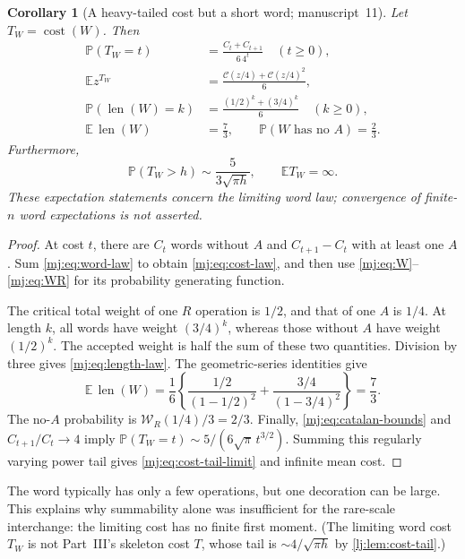 \documentclass[11pt,a4paper]{article}
\newtheorem{corollary}[corollary]{Corollary}
\theoremstyle{definition}\newaliascnt{definition}{theorem}
\theoremstyle{remark}\newaliascnt{remark}{theorem}
\newcommand{\Cat}{\mathcal C}
\newcommand{\ljP}{\mathbb P}
\newcommand{\ljE}{\mathbb E}
\newcommand{\ljcost}{\operatorname{cost}}
\newcommand{\mjlen}{\operatorname{len}}
\begin{document}
\begin{corollary}[A heavy-tailed cost but a short word; manuscript~11]
\label{mj:cor:wordstats}
Let $T_W=\ljcost(W)$. Then
\begin{align}
 \ljP(T_W=t)&=\frac{C_t+C_{t+1}}{6\,4^t}\quad(t\ge0),
 \label{mj:eq:cost-law}\\
 \ljE z^{T_W}&=\frac{\Cat(z/4)+\Cat(z/4)^2}{6},
 \label{mj:eq:cost-pgf}\\
 \ljP(\mjlen(W)=k)&=\frac{(1/2)^k+(3/4)^k}{6}\quad(k\ge0),
 \label{mj:eq:length-law}\\
 \ljE\,\mjlen(W)&=\frac73,
 \qquad
 \ljP(W\text{ has no }A)=\frac23.
 \label{mj:eq:wordfacts}
\end{align}
Furthermore,
\begin{equation}
 \ljP(T_W>h)\sim\frac{5}{3\sqrt{\pi h}},\qquad \ljE T_W=\infty.
 \label{mj:eq:cost-tail-limit}
\end{equation}
These expectation statements concern the limiting word law; convergence of
finite-$n$ word expectations is not asserted.
\end{corollary}
\begin{proof}
At cost $t$, there are $C_t$ words without $A$ and $C_{t+1}-C_t$ with at
least one $A$. Sum \eqref{mj:eq:word-law} to obtain \eqref{mj:eq:cost-law},
and then use \eqref{mj:eq:W}--\eqref{mj:eq:WR} for its probability generating
function.

The critical total weight of one $R$ operation is $1/2$, and that of one $A$
is $1/4$. At length $k$, all words have weight $(3/4)^k$, whereas those
without $A$ have weight $(1/2)^k$. The accepted weight is half the sum of
these two quantities. Division by three gives \eqref{mj:eq:length-law}. The
geometric-series identities give
\[
 \ljE\,\mjlen(W)=\frac16\left\{\frac{1/2}{(1-1/2)^2}
                      +\frac{3/4}{(1-3/4)^2}\right\}=\frac73.
\]
The no-$A$ probability is $\mathcal W_R(1/4)/3=2/3$. Finally,
\eqref{mj:eq:catalan-bounds} and $C_{t+1}/C_t\to4$ imply
$\ljP(T_W=t)\sim5/(6\sqrt\pi\,t^{3/2})$. Summing this regularly varying
power tail gives \eqref{mj:eq:cost-tail-limit} and infinite mean cost.
\end{proof}

The word typically has only a few operations, but one decoration can be
large. This explains why summability alone was insufficient for the
rare-scale interchange: the limiting cost has no finite first moment. (The
limiting word cost $T_W$ is not Part~III's skeleton cost $T$, whose tail is
$\sim4/\sqrt{\pi h}$ by \cref{lj:lem:cost-tail}.)
\end{document}
